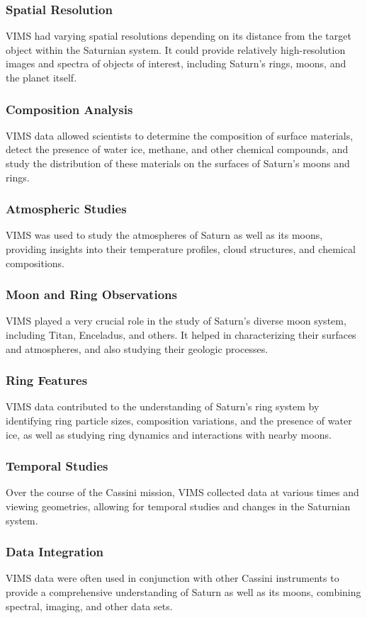 \documentclass[conference]{IEEEtran}
\begin{document}
\subsubsection{Spatial Resolution} 
VIMS had varying spatial resolutions depending on its distance from the target object within the Saturnian system. It could provide relatively high-resolution images and spectra of objects of interest, including Saturn's rings, moons, and the planet itself.
\subsubsection{Composition Analysis} 
VIMS data allowed scientists to determine the composition of surface materials, detect the presence of water ice, methane, and other chemical compounds, and study the distribution of these materials on the surfaces of Saturn's moons and rings.
\subsubsection{Atmospheric Studies} 
VIMS was used to study the atmospheres of Saturn as well as its moons, providing insights into their temperature profiles, cloud structures, and chemical compositions.
\subsubsection{Moon and Ring Observations} 
VIMS played a very crucial role in the study of Saturn's diverse moon
system, including Titan, Enceladus, and others. It helped in characterizing their surfaces and atmospheres, and
also studying their geologic processes.
\subsubsection{Ring Features} 
VIMS data contributed to the understanding of Saturn's ring system by identifying ring particle sizes, composition variations, and the presence of water ice, as well as studying ring dynamics and interactions with nearby moons.
\subsubsection{Temporal Studies} 
Over the course of the Cassini mission, VIMS collected data at various times and viewing geometries, allowing for temporal studies and changes in the Saturnian system.
\subsubsection{Data Integration} 
VIMS data were often used in conjunction with other Cassini instruments to provide a comprehensive understanding of Saturn as well as its moons, combining spectral, imaging, and other data sets.
\end{document}
